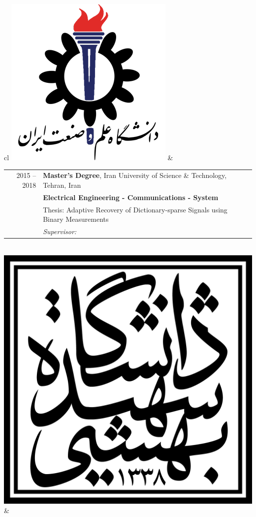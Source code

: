 
\begin{tabular}{cl}
	\includegraphics[scale=0.12]{graphics/IUST_logo_color} & 
	\begin{tabular}{rl}
		\textsc{2015 --2018} & \textbf{Master’s Degree},  Iran University of Science \& Technology,  Tehran, Iran                            \\
		                     & \textbf{Electrical Engineering - Communications - System}                                                     \\
		                     & Thesis: Adaptive Recovery of Dictionary-sparse Signals using Binary Measurements                              \\
		                     & \emph{Supervisor: \link{http://www.iust.ac.ir/content/45110/Dr.-Haddadi}{Assistant Professor Farzan Haddadi}} \\
	\end{tabular}
	\\
	\includegraphics[scale=0.05]{graphics/SBU_logo}        & 

\end{tabular}

